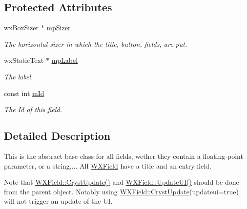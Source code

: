 \subsection*{Protected Attributes}
\begin{DoxyCompactItemize}
\item 
\mbox{\label{class_obj_cryst_1_1_w_x_field_a7853a2d4f8b99e97c9959c01e8cce686}} 
wx\+Box\+Sizer $\ast$ \mbox{\hyperlink{class_obj_cryst_1_1_w_x_field_a7853a2d4f8b99e97c9959c01e8cce686}{mp\+Sizer}}
\begin{DoxyCompactList}\small\item\em The horizontal sizer in which the title, button, fields, are put. \end{DoxyCompactList}\item 
\mbox{\label{class_obj_cryst_1_1_w_x_field_a0823abc300be21229f94eb44fc8acfc3}} 
wx\+Static\+Text $\ast$ \mbox{\hyperlink{class_obj_cryst_1_1_w_x_field_a0823abc300be21229f94eb44fc8acfc3}{mp\+Label}}
\begin{DoxyCompactList}\small\item\em The label. \end{DoxyCompactList}\item 
\mbox{\label{class_obj_cryst_1_1_w_x_field_aa34f4178c0b17434cbdf757d7997afa9}} 
const int \mbox{\hyperlink{class_obj_cryst_1_1_w_x_field_aa34f4178c0b17434cbdf757d7997afa9}{m\+Id}}
\begin{DoxyCompactList}\small\item\em The Id of this field. \end{DoxyCompactList}\end{DoxyCompactItemize}


\subsection{Detailed Description}
This is the abstract base class for all fields, wether they contain a floating-\/point parameter, or a string,... All \mbox{\hyperlink{class_obj_cryst_1_1_w_x_field}{W\+X\+Field}} have a title and an entry field.

Note that \mbox{\hyperlink{class_obj_cryst_1_1_w_x_cryst_obj_basic_a7ac00ae2ae28f1a6fa26e6fa571186b6}{W\+X\+Field\+::\+Cryst\+Update()}} and \mbox{\hyperlink{class_obj_cryst_1_1_w_x_cryst_obj_basic_a3818940b7031ff7e45cf2178c4a99c90}{W\+X\+Field\+::\+Update\+U\+I()}} should be done from the parent object. Notably using \mbox{\hyperlink{class_obj_cryst_1_1_w_x_cryst_obj_basic_a7ac00ae2ae28f1a6fa26e6fa571186b6}{W\+X\+Field\+::\+Cryst\+Update}}(updateui=true) will not trigger an update of the UI. 

